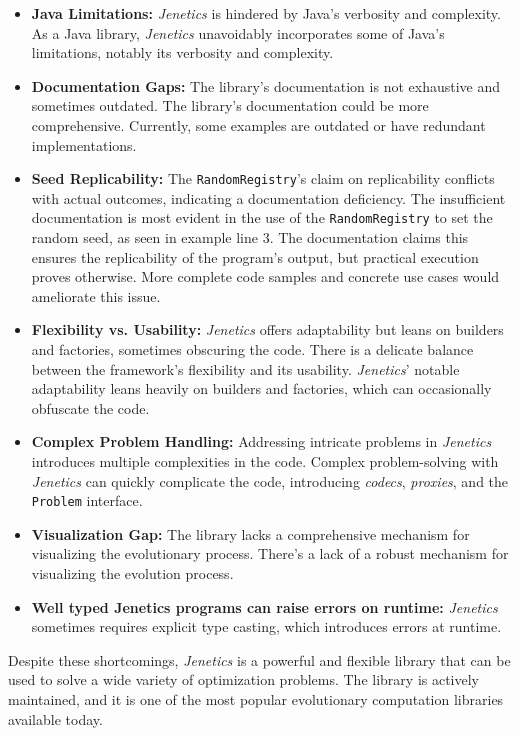  \begin{itemize}
    \item \textbf{Java Limitations:} \textit{Jenetics} is hindered by Java's 
      verbosity and complexity.
      As a Java library, \textit{Jenetics} unavoidably incorporates some of 
      Java's limitations, notably its verbosity and complexity.
    \item \textbf{Documentation Gaps:} The library's documentation is not 
      exhaustive and sometimes outdated.
      The library's documentation could be more comprehensive. Currently, some 
      examples are outdated or have redundant implementations.
    \item \textbf{Seed Replicability:} The \texttt{RandomRegistry}'s claim on 
      replicability conflicts with actual outcomes, indicating a documentation 
      deficiency.
      The insufficient documentation is most evident in the use of the 
      \texttt{RandomRegistry} to set the random seed, as seen in example line 
      3.
      The documentation claims this ensures the replicability of the program's 
      output, but practical execution proves otherwise.
      More complete code samples and concrete use cases would ameliorate this 
      issue.
    \item \textbf{Flexibility vs. Usability:} \textit{Jenetics} offers 
      adaptability but leans on builders and factories, sometimes obscuring the 
      code.
      There is a delicate balance between the framework's flexibility and its 
      usability. \textit{Jenetics}' notable adaptability leans heavily on 
      builders and factories, which can occasionally obfuscate the code.
    \item \textbf{Complex Problem Handling:} Addressing intricate problems in 
      \textit{Jenetics} introduces multiple complexities in the code.
      Complex problem-solving with \textit{Jenetics} can quickly complicate the 
      code, introducing \textit{codecs}, \textit{proxies}, and the 
      \texttt{Problem} interface.
    \item \textbf{Visualization Gap:} The library lacks a comprehensive   
      mechanism for visualizing the evolutionary process.
      There's a lack of a robust mechanism for visualizing the evolution 
      process.
    \item \textbf{Well typed Jenetics programs can raise errors on runtime:} 
      \textit{Jenetics} sometimes requires explicit type casting, which introduces errors at runtime.
  \end{itemize}

  Despite these shortcomings, \textit{Jenetics} is a powerful and flexible
  library that can be used to solve a wide variety of optimization problems.
  The library is actively maintained, and it is one of the most popular
  evolutionary computation libraries available today.
